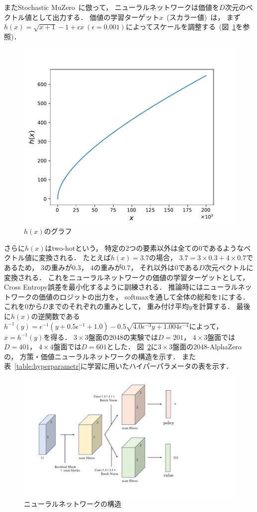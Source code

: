 またStochastic MuZero~\cite{StochasticMuZero}に倣って， ニューラルネットワークは価値を$D$次元のベクトル値として出力する．
価値の学習ターゲット$x$~(スカラー値)~は， まず$h(x)= \sqrt{x+1} - 1 + \epsilon x \ (\epsilon=0.001)$によってスケールを調整する~(図~\ref{fig:transform}を参照)．
\begin{figure}[t]
    \centering
    \includegraphics[width=0.6\linewidth{}]{figures/transform_.pdf}
    \caption{$h(x)$のグラフ}
    \label{fig:transform}
\end{figure}
さらに$h(x)$はtwo-hotという， 特定の$2$つの要素以外は全ての$0$であるようなベクトル値に変換される．
たとえば$h(x)=3.7$の場合， $3.7=3 \times 0.3 + 4 \times 0.7$であるため， $3$の重みが$0.3$， $4$の重みが$0.7$， それ以外は$0$である$D$次元ベクトルに変換される．
これをニューラルネットワークの価値の学習ターゲットとして， Cross Entropy誤差を最小化するように訓練される．
推論時にはニューラルネットワークの価値のロジットの出力を， softmaxを通して全体の総和を$1$にする．
これを$0$から$D$までのそれぞれの重みとして， 重み付け平均$y$を計算する．
最後に$h(x)$の逆関数である$h^{-1}(y)= \epsilon^{-1} (y + 0.5\epsilon^{-1} + 1.0) - 0.5 \sqrt{4.0 \epsilon^{-3} y + 1.004 \epsilon^{-4}}$によって， $x=h^{-1}(y)$を得る．
$3\times3$盤面の2048の実験では$D=201$， $4\times3$盤面では$D=401$， $4\times4$盤面では$D=601$とした．
図~\ref{fig:nn_arch}に$3\times3$盤面の2048-AlphaZeroの， 方策・価値ニューラルネットワークの構造を示す．
また表~\ref{table:hyperparametr}に学習に用いたハイパーパラメータの表を示す．
\begin{figure}[t]
    \centering
    \includegraphics[width=0.6\linewidth{}]{figures/nn_arch.pdf}
    \caption{ニューラルネットワークの構造}
    \label{fig:nn_arch}
\end{figure}

